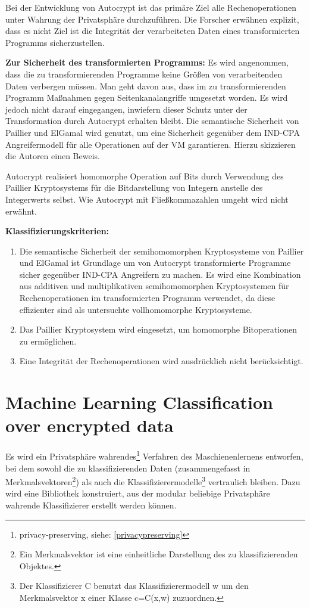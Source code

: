 Bei der Entwicklung von Autocrypt ist das primäre Ziel alle Rechenoperationen unter Wahrung der Privatsphäre durchzuführen. Die Forscher erwähnen explizit, dass es nicht Ziel ist die Integrität der verarbeiteten Daten eines transformierten Programms sicherzustellen.

\textbf{Zur Sicherheit des transformierten Programms:}
Es wird angenommen, dass die zu transformierenden Programme keine Größen von verarbeitenden Daten verbergen müssen. Man geht davon aus, dass im zu transformierenden Programm Maßnahmen gegen Seitenkanalangriffe umgesetzt worden. Es wird jedoch nicht darauf eingegangen, inwiefern dieser Schutz unter der Transformation durch Autocrypt erhalten bleibt. Die semantische Sicherheit von Paillier und ElGamal wird genutzt, um eine Sicherheit gegenüber dem IND-CPA Angreifermodell für alle Operationen auf der VM garantieren. Hierzu skizzieren die Autoren einen Beweis.

Autocrypt realisiert homomorphe Operation auf Bits durch Verwendung des Paillier Kryptosystems für die Bitdarstellung von Integern anstelle des Integerwerts selbst. Wie Autocrypt mit Fließkommazahlen umgeht wird nicht erwähnt.

\textbf{Klassifizierungskriterien:}
\begin{enumerate}
	\item Die semantische Sicherheit der semihomomorphen Kryptosysteme von Paillier und ElGamal ist Grundlage um von Autocrypt transformierte Programme sicher gegenüber IND-CPA Angreifern zu machen. Es wird eine Kombination aus additiven und multiplikativen semihomomorphen Kryptosystemen für Rechenoperationen im transformierten Programm verwendet, da diese effizienter sind als untersuchte vollhomomorphe Kryptosysteme. 
	\item Das Paillier Kryptosystem wird eingesetzt, um homomorphe Bitoperationen zu ermöglichen.
	\item Eine Integrität der Rechenoperationen wird ausdrücklich nicht berücksichtigt.
\end{enumerate}

\section[Machine Learning Classification over encrypted data  \cite{bost2015machine}]{\texorpdfstring{Machine Learning Classification over encrypted data\\  \cite{bost2015machine}}{Machine Learning Classification over encrypted data  \cite{bost2015machine}}}
\label{ML}
Es wird ein Privatsphäre wahrendes\footnote{privacy-preserving, siehe: \ref{privacypreserving}} Verfahren des Maschienenlernens entworfen, bei dem sowohl die zu klassifizierenden Daten (zusammengefasst in Merkmalsvektoren\footnote{Ein Merkmalsvektor ist eine einheitliche Darstellung des zu klassifizierenden Objektes. }) als auch die Klassifizierermodelle\footnote{Der Klassifizierer C benutzt das Klassifizierermodell w um den Merkmalsvektor x einer Klasse c=C(x,w) zuzuordnen.} vertraulich bleiben. Dazu wird eine Bibliothek konstruiert, aus der modular beliebige Privatsphäre wahrende Klassifizierer erstellt werden können.

